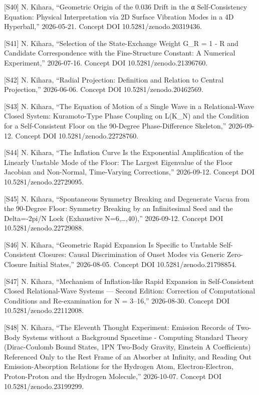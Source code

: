 \documentclass[
  a4paper,
]{article}
\begin{document}
{[}S40{]} N. Kihara, ``Geometric Origin of the 0.036 Drift in the α
Self-Consistency Equation: Physical Interpretation via 2D Surface
Vibration Modes in a 4D Hyperball,'' 2026-05-21. Concept DOI
10.5281/zenodo.20319436.

{[}S41{]} N. Kihara, ``Selection of the State-Exchange Weight G\_R = 1 -
R and Candidate Correspondence with the Fine-Structure Constant: A
Numerical Experiment,'' 2026-07-16. Concept DOI 10.5281/zenodo.21396760.

{[}S42{]} N. Kihara, ``Radial Projection: Definition and Relation to
Central Projection,'' 2026-06-06. Concept DOI 10.5281/zenodo.20462569.

{[}S43{]} N. Kihara, ``The Equation of Motion of a Single Wave in a
Relational-Wave Closed System: Kuramoto-Type Phase Coupling on L(K\_N)
and the Condition for a Self-Consistent Floor on the 90-Degree
Phase-Difference Skeleton,'' 2026-09-12. Concept DOI
10.5281/zenodo.22728760.

{[}S44{]} N. Kihara, ``The Inflation Curve Is the Exponential
Amplification of the Linearly Unstable Mode of the Floor: The Largest
Eigenvalue of the Floor Jacobian and Non-Normal, Time-Varying
Corrections,'' 2026-09-12. Concept DOI 10.5281/zenodo.22729095.

{[}S45{]} N. Kihara, ``Spontaneous Symmetry Breaking and Degenerate
Vacua from the 90-Degree Floor: Symmetry Breaking by an Infinitesimal
Seed and the Delta=-2pi/N Lock (Exhaustive N=6,\ldots,40),'' 2026-09-12.
Concept DOI 10.5281/zenodo.22729088.

{[}S46{]} N. Kihara, ``Geometric Rapid Expansion Is Specific to Unstable
Self-Consistent Closures: Causal Discrimination of Onset Modes via
Generic Zero-Closure Initial States,'' 2026-08-05. Concept DOI
10.5281/zenodo.21798854.

{[}S47{]} N. Kihara, ``Mechanism of Inflation-like Rapid Expansion in
Self-Consistent Closed Relational-Wave Systems --- Second Edition:
Correction of Computational Conditions and Re-examination for N =
3--16,'' 2026-08-30. Concept DOI 10.5281/zenodo.22112008.

{[}S48{]} N. Kihara, ``The Eleventh Thought Experiment: Emission Records
of Two-Body Systems without a Background Spacetime - Computing Standard
Theory (Dirac-Coulomb Bound States, 1PN Two-Body Gravity, Einstein A
Coefficients) Referenced Only to the Rest Frame of an Absorber at
Infinity, and Reading Out Emission-Absorption Relations for the Hydrogen
Atom, Electron-Electron, Proton-Proton and the Hydrogen Molecule,''
2026-10-07. Concept DOI 10.5281/zenodo.23199299.
\end{document}
